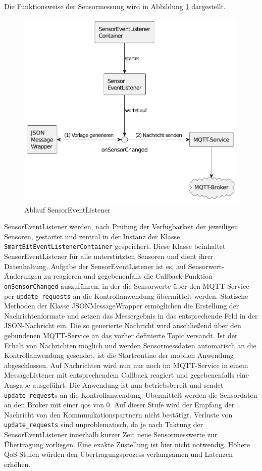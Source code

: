 \documentclass[11pt,a4paper]{report}
\begin{document}
Die Funktionsweise der Sensormessung wird in Abbildung \ref{fig:sensor_event_listener} dargestellt.
\begin{figure}[htbp]
  \centering
  \includegraphics[width=.8\textwidth]{images/sensor_event_listener}
  \caption{Ablauf SensorEventListener}
  \label{fig:sensor_event_listener}
\end{figure}
SensorEventListener werden, nach Prüfung der Verfügbarkeit der jeweiligen Sensoren, gestartet und zentral in der Instanz der Klasse \texttt{SmartBitEventListenerContainer} gespeichert.
Diese Klasse beinhaltet SensorEventListener für alle unterstützten Sensoren und dient ihrer Datenhaltung.
Aufgabe der SensorEventListener ist es, auf Sensorwert-Änderungen zu reagieren und gegebenenfalls die Callback-Funktion \texttt{onSensorChanged} auszuführen, in der die Sensorwerte über den MQTT-Service per \texttt{update\_requests} an die Kontrollanwendung übermittelt werden.
Statische Methoden der Klasse JSONMessageWrapper ermöglichen die Erstellung der Nachrichtenformate und setzen das Messergebnis in das entsprechende Feld in der JSON-Nachricht ein.
Die so generierte Nachricht wird anschließend über den gebundenen MQTT-Service an das vorher definierte Topic versandt.
Ist der Erhalt von Nachrichten möglich und werden Sensormessdaten automatisch an die Kontrollanwendung gesendet, ist die Startroutine der mobilen Anwendung abgeschlossen.
Auf Nachrichten wird nun nur noch im MQTT-Service in einem MessageListener mit entsprechendem Callback reagiert und gegebenenfalls eine Ausgabe ausgeführt.
Die Anwendung ist nun betriebsbereit und sendet \texttt{update\_request}s an die Kontrollanwendung.
Übermittelt werden die Sensordaten an den Broker mit einer \acrfull{qos} von 0.
Auf dieser Stufe wird der Empfang der Nachricht von den Kommunikationspartnern nicht bestätigt.
Verluste von \texttt{update\_requests} sind unproblematisch, da je nach Taktung der SensorEventListener innerhalb kurzer Zeit neue Sensormesswerte zur Übertragung vorliegen.
Eine exakte Zustellung ist hier nicht notwendig.
Höhere QoS-Stufen würden den Übertragungsprozess verlangsamen und Latenzen erhöhen.
\end{document}
